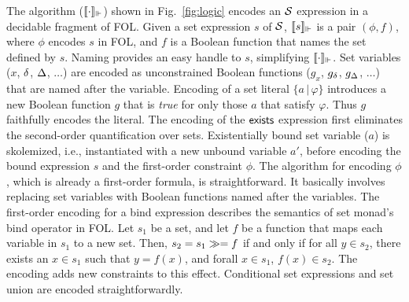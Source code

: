 The algorithm ($\llbracket \cdot \rrbracket_{\Vdash}$) shown in Fig.~\ref{fig:logic}
encodes an $\mathcal{S}$ expression in a decidable fragment of FOL. Given a
set expression $s$ of $\mathcal{S}$, $\llbracket s \rrbracket_{\Vdash}$ is a pair $(\phi,f)$, where
$\phi$ encodes $s$ in FOL, and $f$ is a Boolean function that names
the set defined by $s$.  Naming provides an easy handle to $s$,
simplifying $\llbracket \cdot \rrbracket_{\Vdash}$.  Set variables ($x$, $\delta$, $\Delta$,
$\dots$) are encoded as unconstrained Boolean functions ($g_x$,
$g_{\delta}$, $g_{\Delta}$, $\ldots$) that are named after the variable.
Encoding of a set literal $\{a\,|\,\varphi\}$ introduces a new Boolean
function $g$ that is \emph{true} for only those $a$ that satisfy $\varphi$.
Thus $g$ faithfully encodes the literal. The encoding of the
${\sf exists}{}$ expression first eliminates the second-order
quantification over sets.  Existentially bound set variable ($a$) is
skolemized, i.e., instantiated with a new unbound variable $a'$,
before encoding the bound expression $s$ and the first-order
constraint $\phi$. The algorithm for encoding $\phi$, which is already
a first-order formula, is straightforward. It basically involves
replacing set variables with Boolean functions named after the
variables. The first-order encoding for a bind expression describes
the semantics of set monad's bind operator in FOL. Let $s_1$ be a set, and
let $f$ be a function that maps each variable in $s_1$ to a new
set. Then, $s_2 = s_1 \gg= f$ if and only if for all $y\in s_2$,
there exists an $x \in s_1$ such that $y = f(x)$, and forall $x\in
s_1$, $f(x)\in s_2$. The encoding adds new constraints to this
effect. Conditional set expressions and set union are encoded
straightforwardly.

